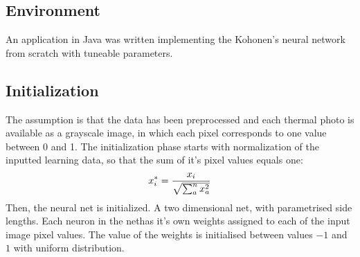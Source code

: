 \documentclass[pdftex]{article}
\begin{document}
\subsection{Environment}
An application in Java was written implementing the Kohonen's neural network from scratch with tuneable parameters.
\subsection{Initialization}
The assumption is that the data has been preprocessed and each thermal photo is available as a grayscale image, in which each pixel corresponds to one value between 0 and 1. The initialization phase starts with normalization of the inputted learning data, so that the sum of it's pixel values equals one:
$$ x_i^* = {x_i \over \sqrt{\sum_{a}^{n} x_a^2}} $$
Then, the neural net is initialized. A two dimensional net, with parametrised side lengths. Each neuron in the nethas it's own weights assigned to each of the input image pixel values. The value of the weights is initialised between values $-1$ and $1$ with uniform distribution.
\end{document}
